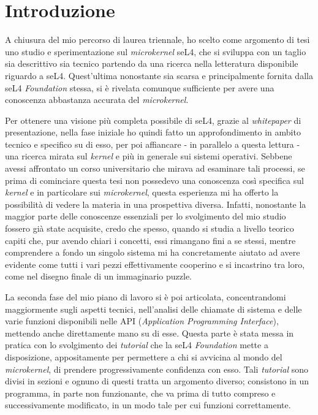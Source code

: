 \chapter{Introduzione}
A chiusura del mio percorso di laurea triennale, ho scelto come argomento di tesi uno studio e sperimentazione sul \textit{microkernel} seL4, che si sviluppa con un taglio sia descrittivo sia tecnico partendo da una ricerca nella letteratura disponibile riguardo a seL4. Quest'ultima nonostante sia scarsa e principalmente fornita dalla seL4 \textit{Foundation} stessa, si è rivelata comunque sufficiente per avere una conoscenza abbastanza accurata del \textit{microkernel}.

Per ottenere una visione più completa possibile di seL4, grazie al \textit{whitepaper} \cite{sel4-whitepaper} di presentazione, nella fase iniziale ho quindi fatto un approfondimento in ambito tecnico e specifico su di esso, per poi affiancare - in parallelo a questa lettura - una ricerca mirata sul \textit{kernel} e più in generale sui sistemi operativi. Sebbene avessi affrontato un corso universitario che mirava ad esaminare tali processi, se prima di cominciare questa tesi non possedevo una conoscenza così specifica sul \textit{kernel} e in particolare sui \textit{microkernel}, questa esperienza mi ha offerto la possibilità di vedere la materia in una prospettiva diversa. Infatti, nonostante la maggior parte delle conoscenze essenziali per lo svolgimento del mio studio fossero già state acquisite, credo che spesso, quando si studia a livello teorico capiti che, pur avendo chiari i concetti, essi rimangano fini a se stessi, mentre comprendere a fondo un singolo sistema mi ha concretamente aiutato ad avere evidente come tutti i vari pezzi effettivamente cooperino e si incastrino tra loro, come nel disegno finale di un immaginario puzzle.

La seconda fase del mio piano di lavoro si è poi articolata, concentrandomi maggiormente sugli aspetti tecnici, nell'analisi delle chiamate di sistema e delle varie funzioni disponibili nelle API (\textit{Application Programming Interface}), mettendo anche direttamente mano su di esse. Questa parte è stata messa in pratica con lo svolgimento dei \textit{tutorial} che la seL4 \textit{Foundation} mette a disposizione, appositamente per permettere a chi si avvicina al mondo del \textit{microkernel}, di prendere progressivamente confidenza con esso. Tali \textit{tutorial} sono divisi in sezioni e ognuno di questi tratta un argomento diverso; consistono in un programma, in parte non funzionante, che va prima di tutto compreso e successivamente modificato, in un modo tale per cui funzioni correttamente.

